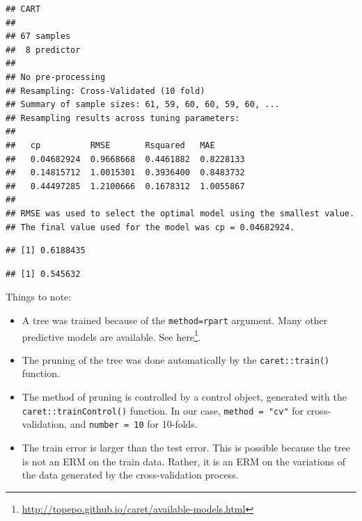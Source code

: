 \documentclass[]{book}
\newenvironment{Shaded}{\begin{snugshade}}{\end{snugshade}}
\newcommand{\CommentTok}[1]{\textcolor[rgb]{0.56,0.35,0.01}{\textit{#1}}}
\newcommand{\DataTypeTok}[1]{\textcolor[rgb]{0.13,0.29,0.53}{#1}}
\newcommand{\FloatTok}[1]{\textcolor[rgb]{0.00,0.00,0.81}{#1}}
\newcommand{\KeywordTok}[1]{\textcolor[rgb]{0.13,0.29,0.53}{\textbf{#1}}}
\newcommand{\NormalTok}[1]{#1}
\newcommand{\OperatorTok}[1]{\textcolor[rgb]{0.81,0.36,0.00}{\textbf{#1}}}
\newcommand{\StringTok}[1]{\textcolor[rgb]{0.31,0.60,0.02}{#1}}
\providecommand{\tightlist}{%
  \setlength{\itemsep}{0pt}\setlength{\parskip}{0pt}}
\renewcommand{\href}[2]{#2\footnote{\url{#1}}}
\theoremstyle{definition}
\theoremstyle{definition}
\theoremstyle{definition}
\theoremstyle{remark}
\begin{document}
\begin{verbatim}
## CART 
## 
## 67 samples
##  8 predictor
## 
## No pre-processing
## Resampling: Cross-Validated (10 fold) 
## Summary of sample sizes: 61, 59, 60, 60, 59, 60, ... 
## Resampling results across tuning parameters:
## 
##   cp          RMSE       Rsquared   MAE      
##   0.04682924  0.9668668  0.4461882  0.8228133
##   0.14815712  1.0015301  0.3936400  0.8483732
##   0.44497285  1.2100666  0.1678312  1.0055867
## 
## RMSE was used to select the optimal model using the smallest value.
## The final value used for the model was cp = 0.04682924.
\end{verbatim}

\begin{Shaded}
\end{Shaded}

\begin{verbatim}
## [1] 0.6188435
\end{verbatim}

\begin{Shaded}
\end{Shaded}

\begin{verbatim}
## [1] 0.545632
\end{verbatim}

Things to note:

\begin{itemize}
\tightlist
\item
  A tree was trained because of the \texttt{method=\textquotesingle{}rpart\textquotesingle{}} argument. Many other predictive models are available. See \href{http://topepo.github.io/caret/available-models.html}{here}.
\item
  The pruning of the tree was done automatically by the \texttt{caret::train()} function.
\item
  The method of pruning is controlled by a control object, generated with the \texttt{caret::trainControl()} function. In our case, \texttt{method\ =\ "cv"} for cross-validation, and \texttt{number\ =\ 10} for 10-folds.
\item
  The train error is larger than the test error. This is possible because the tree is not an ERM on the train data. Rather, it is an ERM on the variations of the data generated by the cross-validation process.
\end{itemize}
\end{document}
